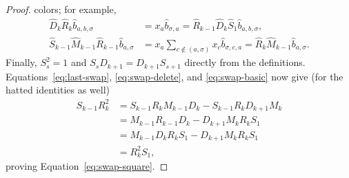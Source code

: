\documentclass[12pt]{article}
\theoremstyle{plain}
\theoremstyle{definition}
\theoremstyle{remark}
\begin{document}
\begin{proof}
colors; for example,
\begin{align*}
\hat D_k\hat R_k\hat b_{a,b,\sigma}
 &=x_a\hat b_{\sigma,a}
  =\hat R_{k-1}\hat D_k\hat S_1\hat b_{a,b,\sigma},\\
\hat S_{k-1}\hat M_{k-1}\hat R_{k-1}\hat b_{a,\sigma}
 &=x_a\sum_{c\notin(a,\sigma)}x_c\hat b_{\sigma,c,a}
  =\hat R_k\hat M_{k-1}\hat b_{a,\sigma}.
\end{align*}
Finally, $S_s^2=1$ and $S_sD_{k+1}=D_{k+1}S_{s+1}$ directly from the
definitions. Equations~\eqref{eq:last-swap}, \eqref{eq:swap-delete}, and
\eqref{eq:swap-basic} now give (for the hatted identities as well)
\begin{align*}
S_{k-1}R_k^2
&=S_{k-1}R_kM_{k-1}D_k-S_{k-1}R_kD_{k+1}M_k\\
&=M_{k-1}R_{k-1}D_k-D_{k+1}M_kR_kS_1\\
&=M_{k-1}D_kR_kS_1-D_{k+1}M_kR_kS_1\\
&=R_k^2S_1,
\end{align*}
proving Equation~\eqref{eq:swap-square}.
\end{proof}
\end{document}
